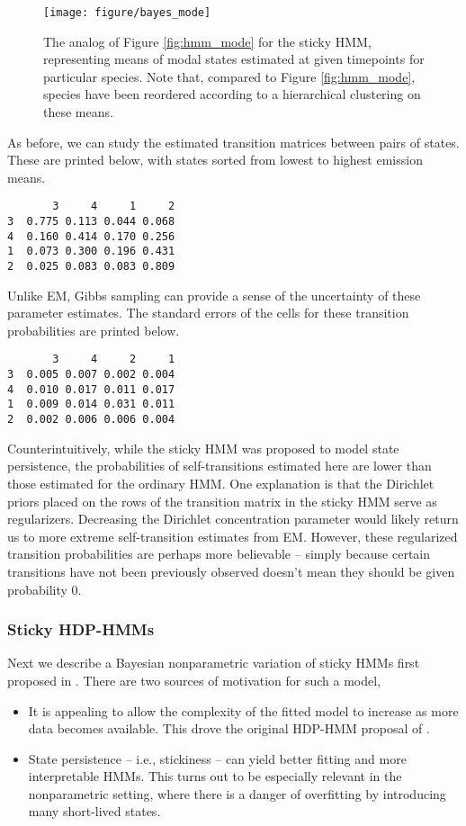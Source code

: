 \documentclass[14pt]{extarticle}
\begin{document}
\begin{figure}
  \centering
  \texttt{[image: figure/bayes\_mode]}
  \caption{The analog of Figure \ref{fig:hmm_mode} for the sticky HMM,
    representing means of modal states estimated at given timepoints for
    particular species. Note that, compared to Figure \ref{fig:hmm_mode},
    species have been reordered according to a hierarchical clustering on these
    means. \label{fig:bayes_mode} }
\end{figure}

As before, we can study the estimated transition matrices between pairs of
states. These are printed below, with states sorted from lowest to highest
emission means.
\begin{verbatim}
       3     4     1     2
3  0.775 0.113 0.044 0.068
4  0.160 0.414 0.170 0.256
1  0.073 0.300 0.196 0.431
2  0.025 0.083 0.083 0.809
\end{verbatim}

Unlike EM, Gibbs sampling can provide a sense of the uncertainty of these
parameter estimates. The standard errors of the cells for these transition
probabilities are printed below.
\begin{verbatim}
       3     4     2     1
3  0.005 0.007 0.002 0.004
4  0.010 0.017 0.011 0.017
1  0.009 0.014 0.031 0.011
2  0.002 0.006 0.006 0.004
\end{verbatim}

Counterintuitively, while the sticky HMM was proposed to model state
persistence, the probabilities of self-transitions estimated here are lower than
those estimated for the ordinary HMM. One explanation is that the Dirichlet
priors placed on the rows of the transition matrix in the sticky HMM serve as
regularizers. Decreasing the Dirichlet concentration parameter would likely
return us to more extreme self-transition estimates from EM. However, these
regularized transition probabilities are perhaps more believable -- simply
because certain transitions have not been previously observed doesn't mean they
should be given probability 0.

\subsubsection{Sticky HDP-HMMs}
\label{sec:sticky_hdp_hmm}

Next we describe a Bayesian nonparametric variation of sticky HMMs first
proposed in \citep{fox2008hdp}. There are two sources of motivation for such a
model,
\begin{itemize}
\item It is appealing to allow the complexity of the fitted model to increase as
  more data becomes available. This drove the original HDP-HMM proposal of
  \citep{teh2006hierarchical}.
\item State persistence -- i.e., stickiness -- can yield better fitting and more
  interpretable HMMs. This turns out to be especially relevant in the
  nonparametric setting, where there is a danger of overfitting by introducing
  many short-lived states.
\end{itemize}
\end{document}
